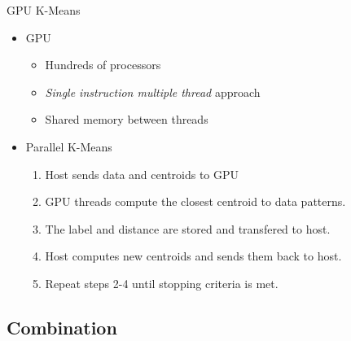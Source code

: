 \begin{frame}{GPU K-Means}

\begin{itemize}

\item GPU

  \begin{itemize}
  \item Hundreds of processors

  \item \emph{Single instruction multiple thread} approach

  \item Shared memory between threads

  \end{itemize}

\item Parallel K-Means

  \begin{enumerate}

  \item Host sends data and centroids to GPU

  \item GPU threads compute the closest centroid to data patterns.

  \item The label and distance are stored and transfered to host.

  \item Host computes new centroids and sends them back to host.

  \item Repeat steps 2-4 until stopping criteria is met.

  \end{enumerate}

\end{itemize}

\end{frame}



        
\subsection{Combination}

